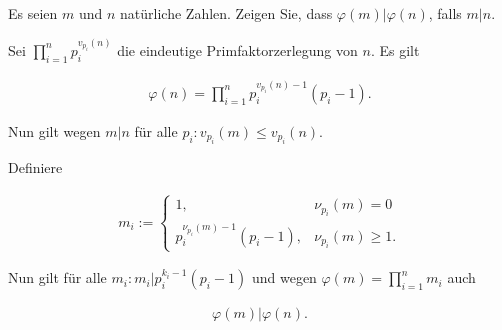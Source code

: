 
\begin{exercise}

Es seien $m$ und $n$ natürliche Zahlen. Zeigen Sie, dass $\varphi(m) | \varphi(n)$, falls $m|n$.

\end{exercise}


\begin{solution}

Sei $\prod_{i=1}^n p_i^{v_{p_i}(n)}$ die eindeutige Primfaktorzerlegung von $n$.
Es gilt 

\begin{align*}
    \varphi(n) = \prod_{i=1}^n p_i^{v_{p_i}(n) - 1}(p_i - 1).
\end{align*}

Nun gilt wegen $m|n$ für alle $p_i: v_{p_i}(m) \leq v_{p_i}(n)$.

Definiere

\begin{align*}
    m_i := \begin{cases}
        1, & \nu_{p_i}(m) = 0 \\
        p_i^{\nu_{p_i}(m) - 1}(p_i - 1), & \nu_{p_i}(m) \geq 1.
    \end{cases}
\end{align*}

Nun gilt für alle $m_i: m_i | p_i^{k_i - 1}(p_i - 1)$ und wegen
$\varphi(m) = \prod_{i=1}^n m_i$ auch

\begin{align*}
    \varphi(m) | \varphi(n).
\end{align*}

\end{solution}

